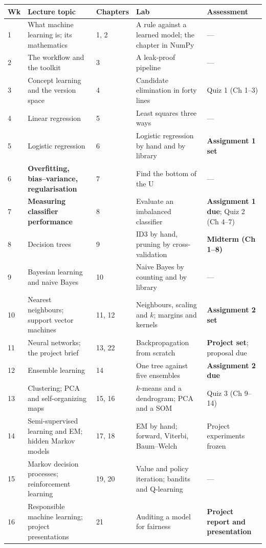 \begin{longtable}{@{}L{1.0cm}L{3.6cm}L{1.9cm}L{4.4cm}L{3.3cm}@{}}
\toprule
{}
\textbf{Wk} & \textbf{Lecture topic} & \textbf{Chapters} & \textbf{Lab} & \textbf{Assessment} \\
\midrule
{} & What machine learning is; its mathematics & 1, 2 & A rule against a learned model;
the chapter in NumPy & --- \\
2 & The workflow and the toolkit & 3 & A leak-proof pipeline & --- \\
3 & Concept learning and the version space & 4 & Candidate elimination in forty lines &
Quiz 1 (Ch 1--3) \\
4 & Linear regression & 5 & Least squares three ways & --- \\
5 & Logistic regression & 6 & Logistic regression by hand and by library &
\textbf{Assignment 1 set} \\
6 & \textbf{Overfitting, bias--variance, regularisation} & 7 & Find the bottom of the U
& --- \\
7 & \textbf{Measuring classifier performance} & 8 & Evaluate an imbalanced classifier &
\textbf{Assignment 1 due}; Quiz 2 (Ch 4--7) \\
8 & Decision trees & 9 & ID3 by hand, pruning by cross-validation &
\textbf{Midterm (Ch 1--8)} \\
9 & Bayesian learning and naive Bayes & 10 & Naive Bayes by counting and by library &
--- \\
10 & Nearest neighbours; support vector machines & 11, 12 & Neighbours, scaling and $k$;
margins and kernels & \textbf{Assignment 2 set} \\
11 & Neural networks; the project brief & 13, 22 & Backpropagation from scratch &
\textbf{Project set}; proposal due \\
12 & Ensemble learning & 14 & One tree against five ensembles &
\textbf{Assignment 2 due} \\
13 & Clustering; PCA and self-organizing maps & 15, 16 & $k$-means and a dendrogram;
PCA and a SOM & Quiz 3 (Ch 9--14) \\
14 & Semi-supervised learning and EM; hidden Markov models & 17, 18 & EM by hand;
forward, Viterbi, Baum--Welch & Project experiments frozen \\
15 & Markov decision processes; reinforcement learning & 19, 20 & Value and policy
iteration; bandits and Q-learning & --- \\
16 & Responsible machine learning; project presentations & 21 & Auditing a model for
fairness & \textbf{Project report and presentation} \\
\bottomrule
\end{longtable}

